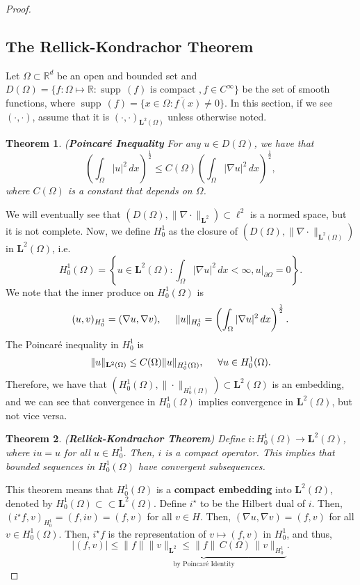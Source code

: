 \documentclass[oneside]{book}
\newtheorem{theorem}{Theorem}
\newcommand{\R}{{\mathbb R}}
\newcommand{\p}{\partial}
\newcommand{\Om}{\Omega}
\DeclareMathOperator{\supp}{supp\,}
\newcommand{\dint}{\displaystyle\int}
\newcommand{\dintom}{\dint_{\Om}}
\newcommand{\ov}{\overline}
\newcommand{\ml}{\mathbf{L}}
\newcommand{\sbs}{\subset}
\newcommand{\Hz}{H_0^1}
\newcommand{\Hzo}{H_0^1(\Om)}
\newcommand{\mlt}{\ml^2}
\newcommand{\mlto}{\ml^2(\Om)}
\newcommand{\is}{i^{\star}}
\begin{document}
\begin{proof}
\subsection*{The Rellick-Kondrachor Theorem}
Let $\Om \sbs \R^d$ be an open and bounded set and $D(\Om) = \{ f: \Om \mapsto \R : \supp(f) \text{ is compact }, f \in C^{\infty} \}$ be the set of smooth functions, where $\supp(f) = \ov{\{ x \in \Om : f(x) \neq 0 \}}$. In this section, if we see $(\cdot, \cdot)$, assume that it is $(\cdot, \cdot)_{\ml^2(\Om)}$ unless otherwise noted. 
\begin{theorem}(\textbf{Poincar\'e Inequality}
For any $u \in D(\Om)$, we have that 
\[ \left( \dintom |u|^2 \, dx \right)^{\frac{1}{2}} \leq C(\Om) \left( \dintom |\nabla u|^2 \, dx \right)^{\frac{1}{2}},\]
where $C(\Om)$ is a constant that depends on $\Om$.
\end{theorem}
We will eventually see that $\left( D(\Om), \| \nabla \cdot \|_{\ml^2} \right) \sbs \ell^2$ is a normed space, but it is not complete. Now, we define $\Hz$ as the closure of $\left( D(\Om), \| \nabla \cdot \|_{\ml^2(\Om)} \right)$ in $\ml^2(\Om)$, i.e. 
\[ \Hz(\Om) = \left\lbrace u \in \ml^2(\Om) : \dintom |\nabla u|^2\, dx < \infty, u \vert_{\p \Om} = 0 \right \rbrace. \]
We note that the inner produce on $\Hz(\Om)$ is 
\[ (u, v)_{\Hz} = (\nabla u, \nabla v),\hspace{5mm} \| u \|_{\Hz} =\left( \dintom | \nabla u|^2 \, dx \right)^{\frac{1}{2}}. \]
The Poincar\'e inequality in $\Hz$ is 
\[ \| u \|_{\ml^2(\Om)} \leq C(\Om) \| u \|_{\Hzo}, \hspace{5mm} \forall u \in \Hzo.\]
Therefore, we have that $(\Hzo, \| \cdot \|_{\Hzo}) \sbs \ml^2(\Om)$ is an embedding, and we can see that convergence in $\Hzo$ implies convergence in $\ml^2(\Om)$, but not vice versa. 
\begin{theorem}(\textbf{Rellick-Kondrachor Theorem}) Define $i: \Hzo \to \mlto$, where $iu = u$ for all $u \in \Hz$. Then, $i$ is a compact operator. This implies that bounded sequences in $\Hzo$ have convergent subsequences.
\end{theorem}
This theorem means that $\Hzo$ is a \textbf{compact embedding} into $\mlto$, denoted by $\Hzo \sbs \sbs \mlto$. Define $\is$ to be the Hilbert dual of $i$. Then, $(\is f, v)_{\Hz} = (f, iv) = (f, v)$ for all $v \in H$. Then, $(\nabla u, \nabla v) = (f, v)$ for all $v \in \Hzo$. Then, $\is f$ is the representation of $v \mapsto (f, v)$ in $\Hz$, and thus, 
\[ |(f, v)| \leq \underbrace{\| f \| \| v \|_{\mlt} \leq \| f \|  \, C(\Om)  \, \| v \|_{\Hz}}_{\text{by Poincar\'e Identity}}. \]

\end{proof}
\end{document}
